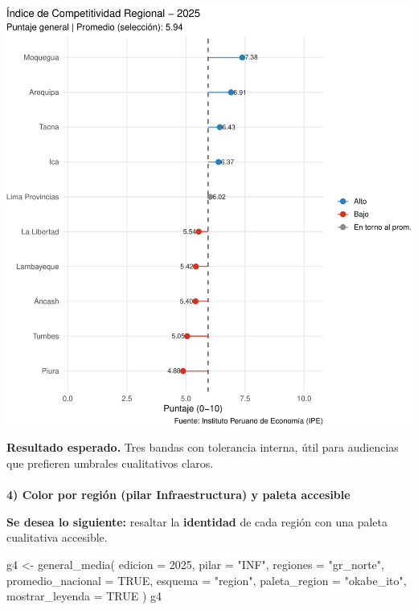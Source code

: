 \documentclass[
  11pt,
  letterpaper,
  DIV=11,
  numbers=noendperiod]{scrartcl}
\makeatletter
\let\oldparagraph\paragraph
\renewcommand{\paragraph}{
    \@ifstar
      \xxxParagraphStar
      \xxxParagraphNoStar
  }
\newcommand{\xxxParagraphStar}[1]{\oldparagraph*{#1}\mbox{}}
\newcommand{\xxxParagraphNoStar}[1]{\oldparagraph{#1}\mbox{}}
\newenvironment{Shaded}{\begin{snugshade}}{\end{snugshade}}
\newcommand{\AttributeTok}[1]{\textcolor[rgb]{0.40,0.45,0.13}{#1}}
\newcommand{\ConstantTok}[1]{\textcolor[rgb]{0.56,0.35,0.01}{#1}}
\newcommand{\DecValTok}[1]{\textcolor[rgb]{0.68,0.00,0.00}{#1}}
\newcommand{\FunctionTok}[1]{\textcolor[rgb]{0.28,0.35,0.67}{#1}}
\newcommand{\NormalTok}[1]{\textcolor[rgb]{0.00,0.23,0.31}{#1}}
\newcommand{\OtherTok}[1]{\textcolor[rgb]{0.00,0.23,0.31}{#1}}
\newcommand{\StringTok}[1]{\textcolor[rgb]{0.13,0.47,0.30}{#1}}
\makeatother
\begin{document}
\includegraphics{Manual_files/figure-pdf/unnamed-chunk-49-1.pdf}

\textbf{Resultado esperado.} Tres bandas con tolerancia interna, útil
para audiencias que prefieren umbrales cualitativos claros.

\paragraph{\texorpdfstring{\textbf{4) Color por región (pilar
Infraestructura) y paleta
accesible}}{4) Color por región (pilar Infraestructura) y paleta accesible}}\label{color-por-regiuxf3n-pilar-infraestructura-y-paleta-accesible}

\textbf{Se desea lo siguiente:} resaltar la \textbf{identidad} de cada
región con una paleta cualitativa accesible.

\begin{Shaded}
\begin{Highlighting}[]
\NormalTok{g4 }\OtherTok{\textless{}{-}} \FunctionTok{general\_media}\NormalTok{(}
  \AttributeTok{edicion =} \DecValTok{2025}\NormalTok{,}
  \AttributeTok{pilar   =} \StringTok{"INF"}\NormalTok{,      }
  \AttributeTok{regiones =} \StringTok{"gr\_norte"}\NormalTok{,}
  \AttributeTok{promedio\_nacional =} \ConstantTok{TRUE}\NormalTok{,}
  \AttributeTok{esquema =} \StringTok{"region"}\NormalTok{,}
  \AttributeTok{paleta\_region =} \StringTok{"okabe\_ito"}\NormalTok{,}
  \AttributeTok{mostrar\_leyenda =} \ConstantTok{TRUE}
\NormalTok{)}
\NormalTok{g4}
\end{Highlighting}
\end{Shaded}
\end{document}
